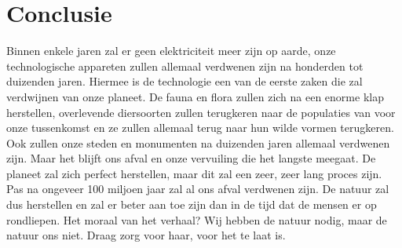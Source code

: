 \section{Conclusie}
Binnen enkele jaren zal er geen elektriciteit meer zijn op aarde, onze technologische appareten zullen allemaal verdwenen zijn na honderden tot duizenden jaren. Hiermee is de technologie een van de eerste zaken die zal verdwijnen van onze planeet.\newline\newline
De fauna en flora zullen zich na een enorme klap herstellen, overlevende diersoorten zullen terugkeren naar de populaties van voor onze tussenkomst en ze zullen allemaal terug naar hun wilde vormen terugkeren. Ook zullen onze steden en monumenten na duizenden jaren allemaal verdwenen zijn.\newline\newline
Maar het blijft ons afval en onze vervuiling die het langste meegaat. De planeet zal zich perfect herstellen, maar dit zal een zeer, zeer lang proces zijn. Pas na ongeveer 100 miljoen jaar zal al ons afval verdwenen zijn. \newline\newline
De natuur zal dus herstellen en zal er beter aan toe zijn dan in de tijd dat de mensen er op rondliepen. Het moraal van het  verhaal? Wij hebben de natuur nodig, maar de natuur ons niet. Draag zorg voor haar, voor het te laat is.


